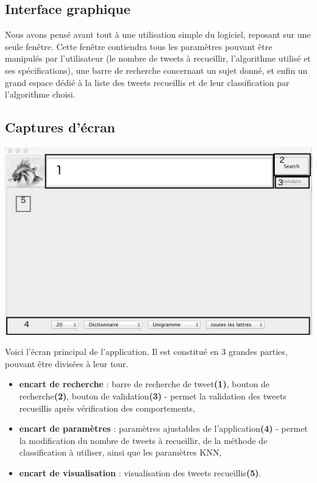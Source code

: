 \documentclass[pdftex,12pt,a4paper]{report}
\begin{document}
\begin{spacing}{1.2}
\section{Interface graphique}

Nous avons pensé avant tout à une utilisation simple du logiciel, reposant sur une seule fenêtre. Cette fenêtre contiendra tous les paramètres pouvant être manipulés par l'utilisateur (le nombre de tweets à recueillir, l'algorithme utilisé et ses spécifications), une barre de recherche concernant un sujet donné, et enfin un grand espace dédié à la liste des tweets recueillis et de leur classification par l'algorithme choisi.

\subsection{Captures d'écran}

\includegraphics[scale=0.5]{img/BehAnTweet_annotation.jpeg}

Voici l'écran principal de l'application. Il est constitué en 3 grandes parties, pouvant être divisées à leur tour.
\begin{itemize}
\item{\textbf{encart de recherche} : barre de recherche de tweet\textbf{(1)}, bouton de recherche\textbf{(2)}, bouton de validation\textbf{(3)} - permet la validation des tweets recueillis après vérification des comportements,}
\item{\textbf{encart de paramètres} : paramètres ajustables de l'application\textbf{(4)} - permet la modification du nombre de tweets à recueillir, de la méthode de classification à utiliser, ainsi que les paramètres KNN,}
\item{\textbf{encart de visualisation} : visualisation des tweets recueillis\textbf{(5)}.}
\end{itemize}


\end{spacing}
\end{document}
